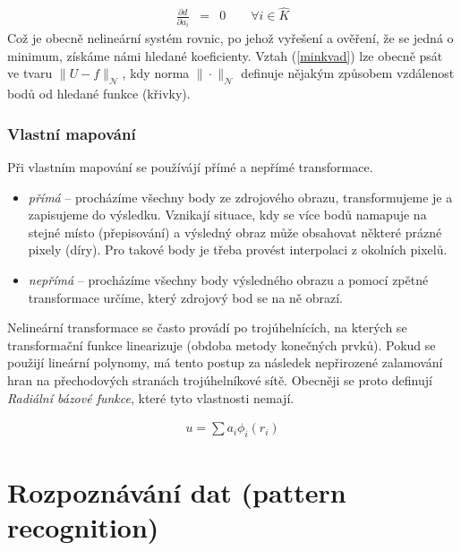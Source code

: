 \begin{eqnarray}
\frac{\partial d}{\partial a_i}&=&0\qquad\forall i\in \hat{K}
\end{eqnarray}
Což je obecně nelineární systém rovnic, po jehož vyřešení a ověření, že se jedná o minimum,  získáme námi hledané koeficienty. Vztah (\ref{minkvad}) lze 
obecně psát ve tvaru $\|U-f\|_\mathcal{N}$, kdy norma $\|\cdot\|_\mathcal{N}$ definuje nějakým způsobem vzdálenost bodů
od hledané funkce (křivky).

\subsubsection{Vlastní mapování}
Při vlastním mapování se používájí přímé a nepřímé transformace.

\begin{itemize}
\item {\em přímá} -- procházíme všechny body ze zdrojového obrazu, transformujeme je a zapisujeme do výsledku. 
Vznikají situace, kdy se více bodů namapuje na stejné místo (přepisování) a výsledný obraz může obsahovat některé
prázné pixely (díry). Pro takové body je třeba provést interpolaci z okolních pixelů.

\item {\em nepřímá} -- procházíme všechny body výsledného obrazu a pomocí zpětné transformace určíme, který zdrojový bod
se na ně obrazí.
\end{itemize}

Nelineární transformace se často provádí po trojúhelnících, na kterých se transformační funkce linearizuje 
(obdoba metody konečných prvků).
Pokud se použijí lineární polynomy, má tento postup za následek nepřirozené zalamování hran na přechodových stranách
trojúhelníkové sítě. Obecněji se proto definují {\em Radiální bázové funkce}, které tyto vlastnosti nemají.

\begin{eqnarray}
u=\sum a_i\phi_i(r_i)
\end{eqnarray}




\section{Rozpoznávání dat (pattern recognition)}
